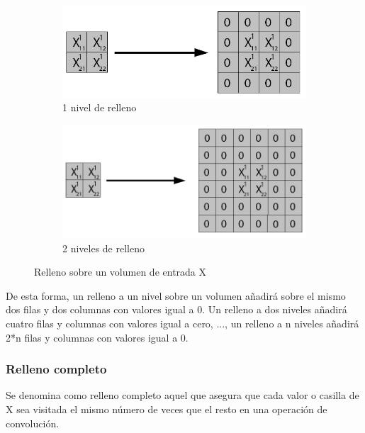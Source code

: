 \begin{figure}[H]
	\centering
	\begin{subfigure}{.5\textwidth}
		\hspace{-15mm}
		\includegraphics[width=1.2\linewidth]{imagenes/padding_a_1_nivel.jpg}  
		\caption{1 nivel de relleno}
	\end{subfigure}%
	\begin{subfigure}{.5\textwidth}
		\hspace{5mm}
		\includegraphics[width=1.2\linewidth]{imagenes/padding_a_2_niveles.jpg}  
		\caption{2 niveles de relleno}
	\end{subfigure}
	\caption{Relleno sobre un volumen de entrada X}
	\label{fig:padding}
\end{figure}

De esta forma, un relleno a un nivel sobre un volumen añadirá sobre el mismo dos filas y dos columnas con valores igual a 0. Un relleno a dos niveles añadirá cuatro filas y columnas con valores igual a cero, ..., un relleno a n niveles añadirá 2*n filas y columnas con valores igual a 0.

\subsubsection{Relleno completo}

Se denomina como relleno completo \cite{full_padding_definicion} \cite{padding_2} aquel que asegura que cada valor o casilla de X sea visitada el mismo número de veces que el resto en una operación de convolución.

